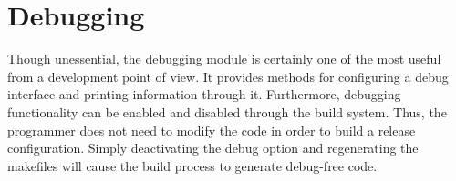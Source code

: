 \section{Debugging}

Though unessential, the debugging module is certainly one of the most useful from a development point of view.
It provides methods for configuring a debug interface and printing information
through it. Furthermore, debugging functionality can be enabled and disabled
through the build system. Thus, the programmer does not need to modify the code
in order to build a release configuration. Simply deactivating the debug
option and regenerating the makefiles will cause the build process to generate
debug-free code.

